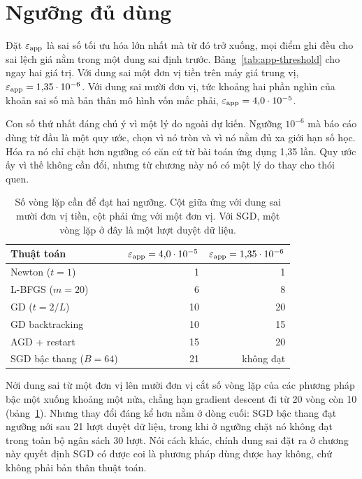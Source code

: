 \section{Ngưỡng đủ dùng}
\label{sec:enough-threshold}

Đặt $\varepsilon_{\text{app}}$ là sai số tối ưu hóa lớn nhất mà từ đó trở xuống, mọi
điểm ghi đều cho sai lệch giá nằm trong một dung sai định trước. Bảng~\ref{tab:app-threshold} cho ngay
hai giá trị. Với dung sai một đơn vị tiền trên máy giá trung vị,
$\varepsilon_{\text{app}} = 1{,}35 \cdot 10^{-6}$. Với dung sai mười đơn vị, tức khoảng
hai phần nghìn của khoản sai số mà bản thân mô hình vốn mắc phải,
$\varepsilon_{\text{app}} = 4{,}0 \cdot 10^{-5}$.

Con số thứ nhất đáng chú ý vì một lý do ngoài dự kiến. Ngưỡng $10^{-6}$ mà báo
cáo dùng từ đầu là một quy ước, chọn vì nó tròn và vì nó nằm đủ xa giới hạn số
học. Hóa ra nó chỉ chặt hơn ngưỡng có căn cứ từ bài toán ứng dụng 1,35 lần. Quy
ước ấy vì thế không cần đổi, nhưng từ chương này nó có một lý do thay cho thói
quen.

\begin{table}[tp]
  \centering
  \caption{Số vòng lặp cần để đạt hai ngưỡng. Cột giữa ứng với dung sai mười đơn
    vị tiền, cột phải ứng với một đơn vị. Với SGD, một vòng lặp ở đây là một lượt
    duyệt dữ liệu.}
  \label{tab:two-thresholds}
  \begin{tabular}{lrr}
    \toprule
    Thuật toán
      & $\varepsilon_{\text{app}} = 4{,}0 \cdot 10^{-5}$
      & $\varepsilon_{\text{app}} = 1{,}35 \cdot 10^{-6}$ \\
    \midrule
    Newton ($t = 1$)         & 1  & 1  \\
    L-BFGS ($m = 20$)        & 6  & 8  \\
    GD ($t = 2/L$)           & 10 & 20 \\
    GD backtracking          & 10 & 15 \\
    AGD + restart            & 15 & 20 \\
    SGD bậc thang ($B = 64$) & 21 & không đạt \\
    \bottomrule
  \end{tabular}
\end{table}

Nới dung sai từ một đơn vị lên mười đơn vị cắt số vòng lặp của các phương pháp
bậc một xuống khoảng một nửa, chẳng hạn gradient descent đi từ 20 vòng còn 10
(bảng~\ref{tab:two-thresholds}). Nhưng thay đổi đáng kể hơn nằm ở dòng cuối: SGD
bậc thang đạt ngưỡng nới sau 21 lượt duyệt dữ liệu, trong khi ở ngưỡng chặt nó
không đạt trong toàn bộ ngân sách 30 lượt. Nói cách khác, chính dung sai đặt ra ở
chương này quyết định SGD có được coi là phương pháp dùng được hay không, chứ
không phải bản thân thuật toán.

